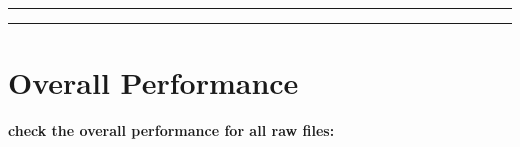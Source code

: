 \documentclass[
]{article}
\begin{document}
\hypertarget{htmlwidget-f9c43329702a9093c11d}{}

\begin{center}\rule{0.5\linewidth}{0.5pt}\end{center}

\hypertarget{htmlwidget-f56c52042aa6e0d6bae2}{}

\begin{center}\rule{0.5\linewidth}{0.5pt}\end{center}

\hypertarget{htmlwidget-58f215df7abd6ef735dd}{}

\hypertarget{overall-performance}{%
\section{Overall Performance}\label{overall-performance}}

\textbf{check the overall performance for all raw files:}

\hypertarget{htmlwidget-7497ab2ac5bf31a5b35b}{}
\end{document}
